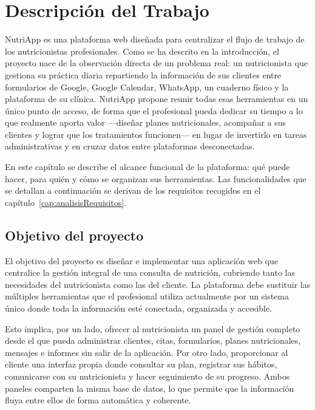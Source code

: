 \chapter{Descripción del Trabajo}
\label{cap:descripcionTrabajo}

NutriApp es una plataforma web diseñada para centralizar el flujo de trabajo de los nutricionistas profesionales. Como se ha descrito en la introducción, el proyecto nace de la observación directa de un problema real: un nutricionista que gestiona su práctica diaria repartiendo la información de sus clientes entre formularios de Google, Google Calendar, WhatsApp, un cuaderno físico y la plataforma de su clínica. NutriApp propone reunir todas esas herramientas en un único punto de acceso, de forma que el profesional pueda dedicar su tiempo a lo que realmente aporta valor ---diseñar planes nutricionales, acompañar a sus clientes y lograr que los tratamientos funcionen--- en lugar de invertirlo en tareas administrativas y en cruzar datos entre plataformas desconectadas.

En este capítulo se describe el alcance funcional de la plataforma: qué puede hacer, para quién y cómo se organizan sus herramientas. Las funcionalidades que se detallan a continuación se derivan de los requisitos recogidos en el capítulo~\ref{cap:analisisRequisitos}.

\section{Objetivo del proyecto}

El objetivo del proyecto es diseñar e implementar una aplicación web que centralice la gestión integral de una consulta de nutrición, cubriendo tanto las necesidades del nutricionista como las del cliente. La plataforma debe sustituir las múltiples herramientas que el profesional utiliza actualmente por un sistema único donde toda la información esté conectada, organizada y accesible.

Esto implica, por un lado, ofrecer al nutricionista un panel de gestión completo desde el que pueda administrar clientes, citas, formularios, planes nutricionales, mensajes e informes sin salir de la aplicación. Por otro lado, proporcionar al cliente una interfaz propia donde consultar su plan, registrar sus hábitos, comunicarse con su nutricionista y hacer seguimiento de su progreso. Ambos paneles comparten la misma base de datos, lo que permite que la información fluya entre ellos de forma automática y coherente.

